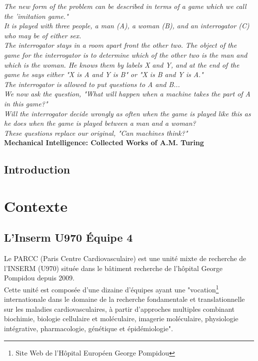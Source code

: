 \documentclass{book}
\begin{document}
\bigskip
\begin{flushright}
\textit{The new form of the problem can be described in terms of a game which we call the 'imitation game."\\
It is played with three people, a man (A), a woman (B), and an interrogator (C) who may be of either sex.\\
The interrogator stays in a room apart front the other two. The object of the game for the interrogator is to determine which of the other two is the man and which is the woman. He knows them by labels X and Y, and at the end of the game he says either "X is A and Y is B" or "X is B and Y is A."\\
The interrogator is allowed to put questions to A and B...\\
We now ask the question, "What will happen when a machine takes the part of A in this game?"\\
Will the interrogator decide wrongly as often when the game is played like this as he does when the game is played between a man and a woman?\\
These questions replace our original, "Can machines think?"}\\
\textbf{Mechanical Intelligence: Collected Works of A.M. Turing}
\end{flushright}


\mainmatter


\newpage
\begin{center}
\section*{Introduction}
\end{center}


\newpage
\section{Contexte}
\subsection{L'Inserm U970 Équipe 4}
\noindent
Le PARCC (Paris Centre Cardiovasculaire) est une unité mixte de recherche de l'INSERM (U970) située dans le bâtiment recherche de l'hôpital George Pompidou depuis 2009.\\
Cette unité est composée d'une dizaine d'équipes ayant une "vocation\footnote{Site Web de l'Hôpital Européen George Pompidou} internationale dans le domaine de la recherche fondamentale et translationnelle sur les maladies cardiovasculaires, à partir d'approches multiples combinant biochimie, biologie cellulaire et moléculaire, imagerie moléculaire, physiologie intégrative, pharmacologie, génétique et épidémiologie".\\
\end{document}
